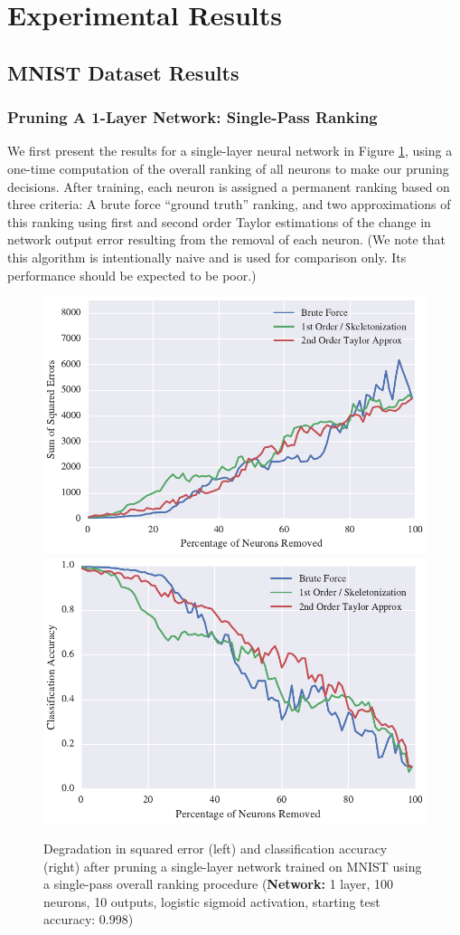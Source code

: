 \section{Experimental Results}
\subsection{MNIST Dataset Results}
\subsubsection{Pruning A 1-Layer Network: Single-Pass Ranking}
We first present the results for a single-layer neural network in Figure \ref{fig:mnist-single-ranking-single-layer}, using a one-time computation of the overall ranking of all neurons to make our pruning decisions. After training, each neuron is assigned a permanent ranking based on three criteria: A brute force ``ground truth'' ranking, and two approximations of this ranking using first and second order Taylor estimations of the change in network output error resulting from the removal of each neuron. (We note that this algorithm is intentionally naive and is used for comparison only. Its performance should be expected to be poor.) 

\begin{figure}
\centering
\includegraphics[width=0.49\linewidth]{png/mnist-acc99-single-pass-method.pdf}
\includegraphics[width=0.49\linewidth]{png/mnist-acc99-single-pass-accuracy.pdf}
\caption{Degradation in squared error (left) and classification accuracy (right) after pruning a single-layer network trained on MNIST using a single-pass overall ranking procedure (\textbf{Network:} 1 layer, 100 neurons, 10 outputs, logistic sigmoid activation, starting test accuracy: 0.998)}
\label{fig:mnist-single-ranking-single-layer}
\end{figure}

